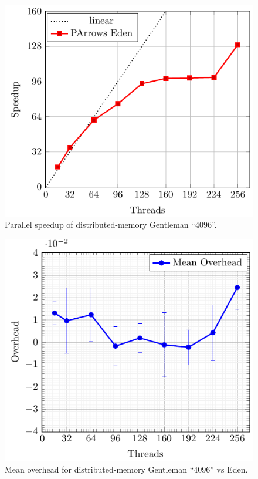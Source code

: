 \documentclass[paper=A4,twoside=true,openright,parskip=full,chapterprefix=true,headings=normal,bibliography=totoc,listof=totoc,titlepage=on,captions=tableabove,draft=false,british]{scrreprt}%
\renewcommand{\enquote}[1]{{``}#1{''}}
\begin{document}
\begin{figure}[h]
\centering
\includegraphics{src/img/perfDistTorus.pdf}
\caption{Parallel speedup of distributed-memory Gentleman
\enquote{4096}.\label{fig:perfDistTorus}}
\end{figure}

\begin{figure}[h]
\centering
\includegraphics{src/img/overDistTorusEden.pdf}
\caption{Mean overhead for distributed-memory Gentleman \enquote{4096}
vs Eden.\label{fig:overDistTorusEden}}
\end{figure}
\end{document}

